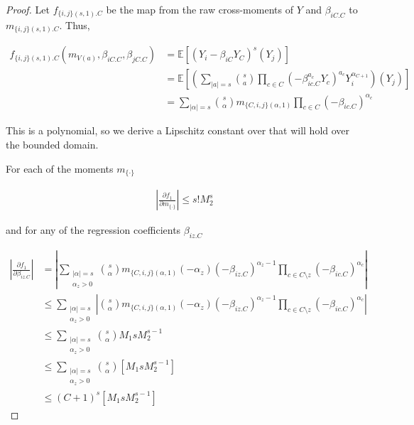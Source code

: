 \documentclass[]{article}
\newcommand{\E}{\mathbb{E}}
\begin{document}
\begin{proof}

Let $f_{\{i,j\}(s,1).C} $ be the map from the raw cross-moments of $Y$ and $\beta_{iC.C}$ to $m_{\{i,j\}(s,1).C}$. Thus,

\begin{equation}
\begin{aligned}
f_{\{i,j\}(s,1).C}\left(m_{V(a)}, \beta_{iC.C}, \beta_{jC.C}\right) &= \E\left[(Y_i - \beta_{iC}Y_C)^s (Y_j)\right]
\\
 &= \E\left[\left(\sum_{|a| = s} {s \choose a} \prod_{c \in C}(-\beta_{ic.C}^{a_c}Y_c)^{a_c} Y_i^{\alpha_{C+1}}\right)(Y_j )\right]
\\
& = \sum_{|\alpha| = s} {s \choose \alpha} m_{\{C,i,j\}(\alpha, 1)} \prod_{c \in C}(-\beta_{ic.C})^{\alpha_c}
\end{aligned}
\end{equation}

This is a polynomial, so we derive a Lipschitz constant over that will hold over the bounded domain.

For each of the moments $m_{\{\cdot \}}$

\begin{equation}
\begin{aligned}
\left|\frac{\partial f_1}{\partial m_{\{\cdot\}} } \right| \leq s! M_2^{s}
\end{aligned}
\end{equation}

and for any of the regression coefficients $\beta_{iz.C}$

\begin{equation}
\begin{aligned}
\left|\frac{\partial f_1}{\partial \beta_{iz.C}} \right|  &= \left| \sum_{\substack{|\alpha| = s \\\alpha_z > 0}} {s \choose \alpha} m_{\{C,i,j\}(\alpha, 1)} (-\alpha_z)(-\beta_{iz.C})^{\alpha_z - 1} \prod_{c \in C\setminus z}(-\beta_{ic.C})^{\alpha_c} \right|
\\
& \leq \sum_{\substack{|\alpha| = s \\\alpha_z > 0}} \left| {s \choose \alpha} m_{\{C,i,j\}(\alpha, 1)} (-\alpha_z)(-\beta_{iz.C})^{\alpha_z - 1} \prod_{c \in C\setminus z}(-\beta_{ic.C})^{\alpha_c} \right|
\\
& \leq \sum_{\substack{|\alpha| = s \\\alpha_z > 0}} {s \choose \alpha} M_1 s M_2^{s - 1}
\\
& \leq \sum_{\substack{|\alpha| = s \\ \alpha_z > 0}} {s \choose \alpha} \left[M_1 s M_2^{s - 1}\right]
\\
& \leq (C+1)^s \left[M_1 s M_2^{s - 1} \right]
\end{aligned}
\end{equation}


\end{proof}
\end{document}
